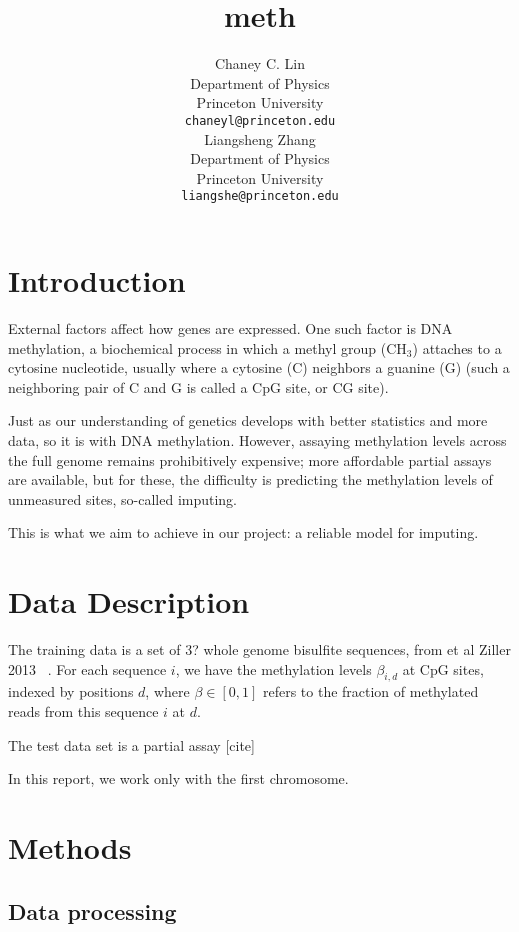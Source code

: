 \documentclass{article} %
\title{meth}
\author{
Chaney C. Lin\\
Department of Physics\\
Princeton University\\
\texttt{chaneyl@princeton.edu} \\
\And
Liangsheng Zhang\\
Department of Physics\\
Princeton University\\
\texttt{liangshe@princeton.edu} \\
}
\begin{document}
\maketitle

\begin{abstract}
\end{abstract}
\section{Introduction}

External factors affect how genes are expressed. One such factor is DNA methylation, a biochemical process in which a methyl group (CH$_3$) attaches to a cytosine nucleotide, usually where a cytosine (C) neighbors a guanine (G) (such a neighboring pair of C and G is called a CpG site, or CG site).

Just as our understanding of genetics develops with better statistics and more data, so it is with DNA methylation. However, assaying methylation levels across the full genome remains prohibitively expensive; more affordable partial assays are available, but for these, the difficulty is predicting the methylation levels of unmeasured sites, so-called imputing.

This is what we aim to achieve in our project: a reliable model for imputing.

\section{Data Description}

The training data is a set of 3? whole genome bisulfite sequences, from et al Ziller 2013 ~\cite{ziller2013charting}. For each sequence $i$, we have the methylation levels $\beta_{i,d}$ at CpG sites, indexed by positions $d$, where $\beta \in [0,1]$ refers to the fraction of methylated reads from this sequence $i$ at $d$.

The test data set is a partial assay [cite]

In this report, we work only with the first chromosome.

\section{Methods}

\subsection{Data processing}
\end{document}
